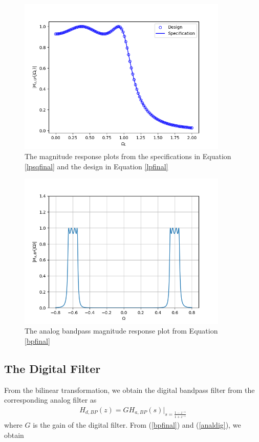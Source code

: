 \documentclass[journal,12pt,twocolumn]{IEEEtran}
\theoremstyle{remark}
\begin{document}
\begin{figure}
\label{fig2}
\includegraphics[width = 10cm]{figs/figure2.png}
\caption{The magnitude response plots from the specifications in Equation \ref{lpsqfinal} and the design in Equation \ref{lpfinal}}
\end{figure}

\begin{figure}
\label{fig3}
\includegraphics[width = 10cm]{figs/figure3.png}
\caption{The analog bandpass magnitude response plot from Equation \ref{bpfinal}} 
\end{figure}


\subsection{\textbf{The Digital Filter}}
From the bilinear transformation, we obtain the digital bandpass filter from the corresponding analog filter as
\begin{eqnarray}
\label{analdig}
H_{d,BP}(z) = GH_{a,BP}(s)\vert_{s = \frac{1-z^{-1}}{1 + z^{-1}}}
\end{eqnarray}
where $G$ is the gain of the digital filter.  From (\ref{bpfinal}) and (\ref{analdig}), we obtain
\end{document}
